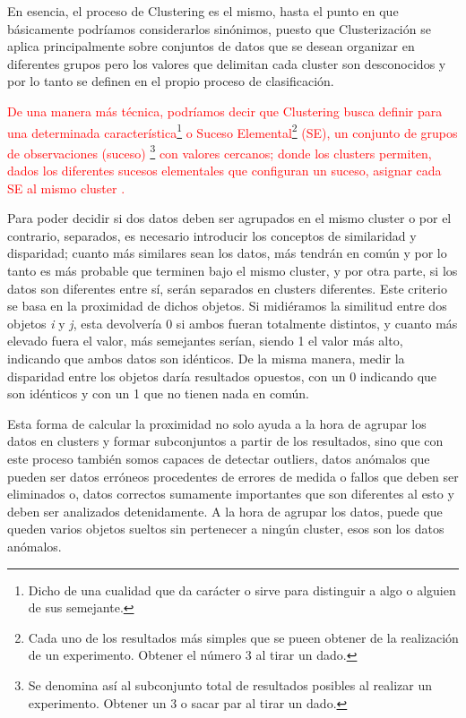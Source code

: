\documentclass[3p,twocolumn]{elsarticle}
\begin{document}
En esencia, el proceso de Clustering es el mismo, hasta el punto en que básicamente podríamos considerarlos sinónimos, puesto que Clusterización se aplica principalmente sobre conjuntos de datos que se desean organizar en diferentes grupos pero los valores que delimitan cada cluster son desconocidos y por lo tanto se definen en el propio proceso de clasificación.

\textcolor{Red} {De una manera más técnica, podríamos decir que Clustering busca definir para una determinada característica\footnote{Dicho de una cualidad que da carácter o sirve para distinguir a algo o alguien de sus semejante.} o Suceso Elemental\footnote{Cada uno de los resultados más simples que se pueen obtener de la realización de un experimento. Obtener el número 3 al tirar un dado.} (SE), un conjunto de grupos de observaciones (suceso) \footnote{Se denomina así al subconjunto total de resultados posibles al realizar un experimento. Obtener un 3 o sacar par al tirar un dado.} con valores cercanos; donde los clusters permiten, dados los diferentes sucesos elementales que configuran un suceso, asignar cada SE al mismo cluster \cite{8}.}

Para poder decidir si dos datos deben ser agrupados en el mismo cluster o por el contrario, separados, es necesario introducir los conceptos de similaridad y disparidad; cuanto más similares sean los datos, más tendrán en común y por lo tanto es más probable que terminen bajo el mismo cluster, y por otra parte, si los datos son diferentes entre sí, serán separados en clusters diferentes. Este criterio se basa en la proximidad de dichos objetos. Si midiéramos la similitud entre dos objetos \textit{i} y \textit{j}, esta devolvería 0 si ambos fueran totalmente distintos, y cuanto más elevado fuera el valor, más semejantes serían, siendo 1 el valor más alto, indicando que ambos datos son idénticos. De la misma manera, medir la disparidad entre los objetos daría resultados opuestos, con un 0 indicando que son idénticos y con un 1 que no tienen nada en común. 

Esta forma de calcular la proximidad no solo ayuda a la hora de agrupar los datos en clusters y formar subconjuntos a partir de los resultados, sino que con este proceso también somos capaces de detectar outliers, datos anómalos que pueden ser datos erróneos procedentes de errores de medida o fallos que deben ser eliminados o, datos correctos sumamente importantes que son diferentes al esto y deben ser analizados detenidamente. A la hora de agrupar los datos, puede que queden varios objetos sueltos sin pertenecer a ningún cluster, esos son los datos anómalos.
\end{document}
